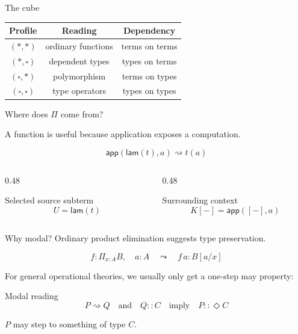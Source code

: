 \documentclass[aspectratio=169,11pt]{beamer}
\newcommand{\rw}{\rightsquigarrow}
\newcommand{\ty}{\mathrel{::}}
\newcommand{\app}{\mathsf{app}}
\newcommand{\lam}{\mathsf{lam}}
\newcommand{\Dia}{\Diamond}
\newcommand{\hole}{[-]}
\begin{document}
\begin{frame}{The cube}
\begin{center}
\begin{tikzpicture}
    \end{tikzpicture}
    \end{center}

\begin{center}
\begin{tabular}{c c c}
\toprule
Profile & Reading & Dependency\\
\midrule
\((\ast,\ast)\) & ordinary functions & terms on terms \\
\((\ast,\square)\) & dependent types & types on terms \\
\((\square,\ast)\) & polymorphism & terms on types \\
\((\square,\square)\) & type operators & types on types \\
\bottomrule
\end{tabular}
\end{center}
\end{frame}

\begin{frame}{Where does \(\Pi\) come from?}
\begin{center}
\Large A function is useful because application exposes a computation.
\end{center}

\vspace{0.5em}
\[
  \app(\lam(t),a)\rw t(a)
\]

\vspace{0.5em}
\begin{columns}[T]
\begin{column}{0.48\textwidth}
\begin{block}{Selected source subterm}
\[
  U=\lam(t)
\]
\end{block}

\end{column}
\begin{column}{0.48\textwidth}
\begin{block}{Surrounding context}
\[
  K\hole=\app(\hole,a)
\]
\end{block}
\end{column}
\end{columns}
\end{frame}

\begin{frame}{Why modal?}
Ordinary product elimination suggests type preservation.

\[
  f: \Pi_{x:A}B,\quad a:A
  \quad\leadsto\quad
  f\,a:B[a/x]
\]

\vspace{0.8em}
For general operational theories, we usually only get a \alert{one-step may property}:


\begin{block}{Modal reading}
\[
  P \rw Q
  \quad\text{and}\quad
  Q\ty C
  \quad\text{imply}\quad
  P\ty\Dia C
\]
\end{block}
$P$ may step to something of type $C.$
\end{frame}
\end{document}
